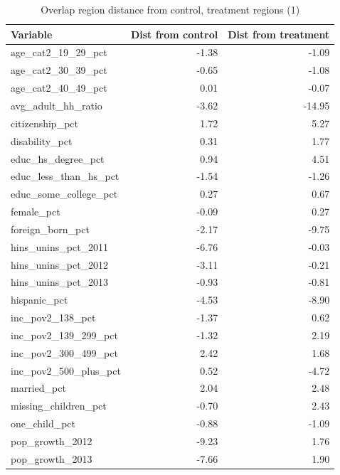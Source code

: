 \documentclass[12pt]{article}
\begin{document}
\begin{table}[ht]
\begin{tabular}{lrr}
  \toprule
Variable & Dist from control & Dist from treatment \\ 
  \midrule
  age\_cat2\_19\_29\_pct & -1.38 & -1.09 \\ 
  age\_cat2\_30\_39\_pct & -0.65 & -1.08 \\ 
  age\_cat2\_40\_49\_pct & 0.01 & -0.07 \\ 
  avg\_adult\_hh\_ratio & -3.62 & -14.95 \\ 
  citizenship\_pct & 1.72 & 5.27 \\ 
  disability\_pct & 0.31 & 1.77 \\ 
  educ\_hs\_degree\_pct & 0.94 & 4.51 \\ 
  educ\_less\_than\_hs\_pct & -1.54 & -1.26 \\ 
  educ\_some\_college\_pct & 0.27 & 0.67 \\ 
  female\_pct & -0.09 & 0.27 \\ 
  foreign\_born\_pct & -2.17 & -9.75 \\ 
  hins\_unins\_pct\_2011 & -6.76 & -0.03 \\ 
  hins\_unins\_pct\_2012 & -3.11 & -0.21 \\ 
  hins\_unins\_pct\_2013 & -0.93 & -0.81 \\ 
  hispanic\_pct & -4.53 & -8.90 \\ 
  inc\_pov2\_138\_pct & -1.37 & 0.62 \\ 
  inc\_pov2\_139\_299\_pct & -1.32 & 2.19 \\ 
  inc\_pov2\_300\_499\_pct & 2.42 & 1.68 \\ 
  inc\_pov2\_500\_plus\_pct & 0.52 & -4.72 \\ 
  married\_pct & 2.04 & 2.48 \\ 
  missing\_children\_pct & -0.70 & 2.43 \\ 
  one\_child\_pct & -0.88 & -1.09 \\ 
  pop\_growth\_2012 & -9.23 & 1.76 \\ 
  pop\_growth\_2013 & -7.66 & 1.90 \\ 
   \bottomrule
\end{tabular}
    \caption{Overlap region distance from control, treatment regions (1)}
    \label{tab:oatedist1}
\end{table}
\end{document}
